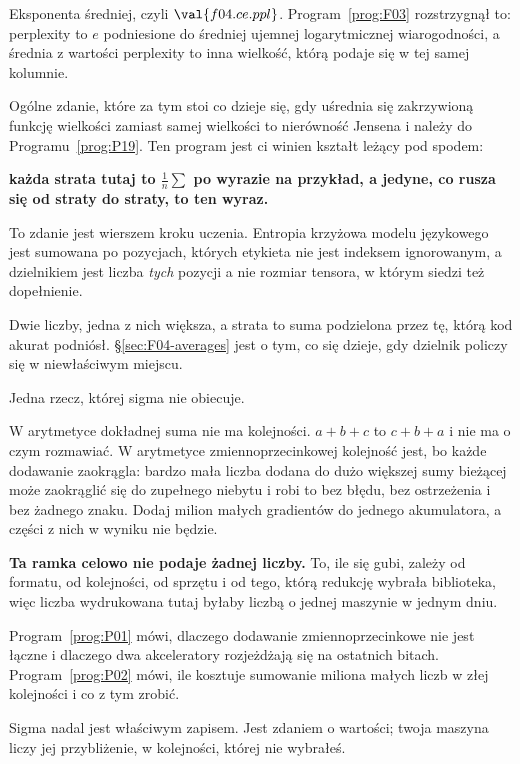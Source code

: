 \begin{fr}
\begin{ansblock}
Eksponenta średniej, czyli $\val{f04.ce.ppl}$. Program~\ref{prog:F03}
rozstrzygnął to: perplexity to $e$ podniesione do średniej ujemnej
logarytmicznej wiarogodności, a średnia z wartości perplexity to inna
wielkość, którą podaje się w tej samej kolumnie.
\end{ansblock}

Ogólne zdanie, które za tym stoi \dash{} co dzieje się, gdy uśrednia się
zakrzywioną funkcję wielkości zamiast samej wielkości \dash{} to nierówność
Jensena i należy do Programu~\ref{prog:P19}. Ten program jest ci winien
kształt leżący pod spodem:

\textbf{każda strata tutaj to $\frac{1}{n}\sum$ po wyrazie na przykład, a
jedyne, co rusza się od straty do straty, to ten wyraz.}

\begin{aibox}
To zdanie jest wierszem kroku uczenia. Entropia krzyżowa modelu językowego
jest sumowana po pozycjach, których etykieta nie jest indeksem
ignorowanym, a dzielnikiem jest liczba \emph{tych} pozycji \dash{} a nie
rozmiar tensora, w którym siedzi też dopełnienie.

Dwie liczby, jedna z nich większa, a strata to suma podzielona przez tę, którą
kod akurat podniósł. \S\ref{sec:F04-averages} jest o tym, co się dzieje, gdy
dzielnik policzy się w niewłaściwym miejscu.
\end{aibox}
\end{fr}

\begin{fr}
Jedna rzecz, której sigma nie obiecuje.

W arytmetyce dokładnej suma nie ma kolejności. $a + b + c$ to $c + b + a$ i
nie ma o czym rozmawiać. W arytmetyce zmiennoprzecinkowej kolejność jest, bo
każde dodawanie zaokrągla: bardzo mała liczba dodana do dużo większej sumy
bieżącej może zaokrąglić się do zupełnego niebytu i robi to bez błędu, bez
ostrzeżenia i bez żadnego znaku. Dodaj milion małych gradientów do jednego
akumulatora, a części z nich w wyniku nie będzie.

\begin{warning}
\textbf{Ta ramka celowo nie podaje żadnej liczby.} To, ile się gubi, zależy od
formatu, od kolejności, od sprzętu i od tego, którą redukcję wybrała
biblioteka, więc liczba wydrukowana tutaj byłaby liczbą o jednej maszynie w
jednym dniu.

Program~\ref{prog:P01} mówi, dlaczego dodawanie zmiennoprzecinkowe nie jest
łączne i
dlaczego dwa akceleratory rozjeżdżają się na ostatnich bitach.
Program~\ref{prog:P02} mówi, ile kosztuje sumowanie miliona małych liczb w złej
kolejności i co z tym zrobić.

Sigma nadal jest właściwym zapisem. Jest zdaniem o wartości; twoja maszyna
liczy jej przybliżenie, w kolejności, której nie wybrałeś.
\end{warning}
\end{fr}

